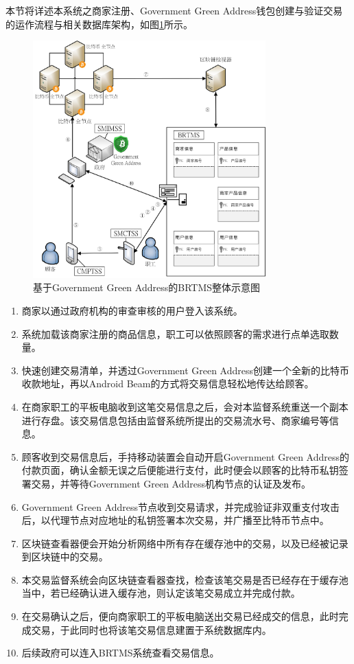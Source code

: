 本节将详述本系统之商家注册、Government Green Address钱包创建与验证交易的运作流程与相关数据库架构，如图\ref{gabpcss}所示。

	\begin{figure}[!htbp]
		\centering
		\includegraphics[width = 0.8\textwidth]{gabpcss.jpg}
		\caption{基于Government Green Address的BRTMS整体示意图}\label{gabpcss}
	\end{figure}

	\begin{enumerate}
		\item 商家以通过政府机构的审查审核的用户登入该系统。
		\item 系统加载该商家注册的商品信息，职工可以依照顾客的需求进行点单选取数量。
		\item 快速创建交易清单，并透过Government Green Address创建一个全新的比特币收款地址，再以Android Beam的方式将交易信息轻松地传达给顾客。
		\item 在商家职工的平板电脑收到这笔交易信息之后，会对本监督系统重送一个副本进行存盘。该交易信息包括由监督系统所提出的交易流水号、商家编号等信息。
		\item 顾客收到交易信息后，手持移动装置会自动开启Government Green Address的付款页面，确认金额无误之后便能进行支付，此时便会以顾客的比特币私钥签署交易，并等待Government Green Address机构节点的认证及发布。
		\item Government Green Address节点收到交易请求，并完成验证非双重支付攻击后，以代理节点对应地址的私钥签署本次交易，并广播至比特币节点中。
		\item 区块链查看器便会开始分析网络中所有存在缓存池中的交易，以及已经被记录到区块链中的交易。
		\item 本交易监督系统会向区块链查看器查找，检查该笔交易是否已经存在于缓存池当中，若已经确认进入缓存池，则认定该笔交易成立并完成付款。
		\item 在交易确认之后，便向商家职工的平板电脑送出交易已经成交的信息，此时完成交易，于此同时也将该笔交易信息建置于系统数据库内。
		\item 后续政府可以连入BRTMS系统查看交易信息。
	\end{enumerate}